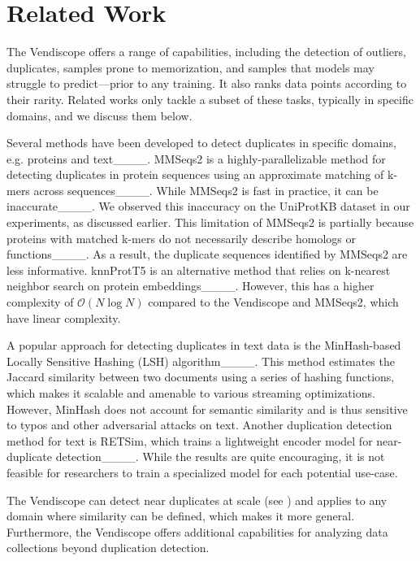 \section{Related Work}
\label{sec:related}

The Vendiscope offers a range of capabilities, including the detection of outliers, duplicates, samples prone to memorization, and samples that models may struggle to predict---prior to any training. It also ranks data points according to their rarity. Related works only tackle a subset of these tasks, typically in specific domains, and we discuss them below.

 Several methods have been developed to detect duplicates in specific domains, e.g. proteins and text____. MMSeqs2 is a highly-parallelizable method for detecting duplicates in protein sequences using an approximate matching of k-mers across sequences____. While MMSeqs2 is fast in practice, it can be inaccurate____. We observed this inaccuracy on the UniProtKB dataset in our experiments, as discussed earlier. This limitation of MMSeqs2 is partially because proteins with matched k-mers do not necessarily describe homologs or functions____. As a result, the duplicate sequences identified by MMSeqs2 are less informative. knnProtT5 is an alternative method that relies on k-nearest neighbor search on protein embeddings____. However, this has a higher complexity of $\mathcal{O}(N\log N)$ compared to the Vendiscope and MMSeqs2, which have linear complexity. 

A popular approach for detecting duplicates in text data is the MinHash-based Locally Sensitive Hashing (LSH) algorithm____. This method estimates the Jaccard similarity between two documents using a series of hashing functions, which makes it scalable and amenable to various streaming optimizations. However, MinHash does not account for semantic similarity and is thus sensitive to typos and other adversarial attacks on text. Another duplication detection method for text is RETSim, which trains a lightweight encoder model for near-duplicate detection____. While the results are quite encouraging, it is not feasible for researchers to train a specialized model for each potential use-case. 

The Vendiscope can detect near duplicates at scale (see ) and applies to any domain where similarity can be defined, which makes it more general. Furthermore, the Vendiscope offers additional capabilities for analyzing data collections beyond duplication detection. 

